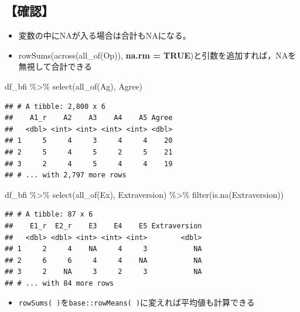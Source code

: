 \documentclass[
  xelatex,ja=standard, b5paper]{bxjsbook}
\newenvironment{Shaded}{\begin{snugshade}}{\end{snugshade}}
\newcommand{\FunctionTok}[1]{\textcolor[rgb]{0.00,0.00,0.00}{#1}}
\newcommand{\NormalTok}[1]{#1}
\newcommand{\SpecialCharTok}[1]{\textcolor[rgb]{0.00,0.00,0.00}{#1}}
\providecommand{\tightlist}{%
  \setlength{\itemsep}{0pt}\setlength{\parskip}{0pt}}
\begin{document}
\hypertarget{ux78baux8a8d}{%
\subsection{【確認】}\label{ux78baux8a8d}}

\begin{itemize}
\tightlist
\item
  変数の中にNAが入る場合は合計もNAになる。
\item
  rowSums(across(all\_of(Op)), \textbf{na.rm = TRUE})と引数を追加すれば，NAを無視して合計できる
\end{itemize}

\begin{Shaded}
\begin{Highlighting}[]
\NormalTok{df\_bfi }\SpecialCharTok{\%\textgreater{}\%} \FunctionTok{select}\NormalTok{(}\FunctionTok{all\_of}\NormalTok{(Ag), Agree)}
\end{Highlighting}
\end{Shaded}

\begin{verbatim}
## # A tibble: 2,800 x 6
##    A1_r    A2    A3    A4    A5 Agree
##   <dbl> <int> <int> <int> <int> <dbl>
## 1     5     4     3     4     4    20
## 2     5     4     5     2     5    21
## 3     2     4     5     4     4    19
## # ... with 2,797 more rows
\end{verbatim}

\begin{Shaded}
\begin{Highlighting}[]
\NormalTok{df\_bfi }\SpecialCharTok{\%\textgreater{}\%} \FunctionTok{select}\NormalTok{(}\FunctionTok{all\_of}\NormalTok{(Ex), Extraversion) }\SpecialCharTok{\%\textgreater{}\%} 
  \FunctionTok{filter}\NormalTok{(}\FunctionTok{is.na}\NormalTok{(Extraversion))}
\end{Highlighting}
\end{Shaded}

\begin{verbatim}
## # A tibble: 87 x 6
##    E1_r  E2_r    E3    E4    E5 Extraversion
##   <dbl> <dbl> <int> <int> <int>        <dbl>
## 1     2     4    NA     4     3           NA
## 2     6     6     4     4    NA           NA
## 3     2    NA     3     2     3           NA
## # ... with 84 more rows
\end{verbatim}

\begin{itemize}
\tightlist
\item
  \texttt{rowSums(\ )}を\texttt{base::rowMeans(\ )}に変えれば平均値も計算できる
\end{itemize}
\end{document}
